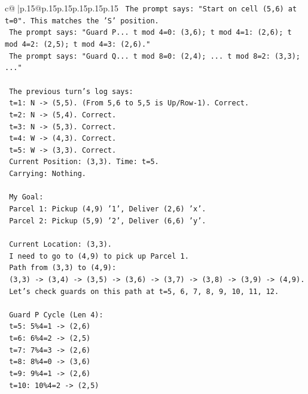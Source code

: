 \documentclass{article}
\begin{document}
{\begin{supertabular}{c@{$\;$}|p{.15\linewidth}@{}p{.15\linewidth}p{.15\linewidth}p{.15\linewidth}p{.15\linewidth}p{.15\linewidth}}
{{{\texttt{  The prompt says: "Start on cell (5,6) at t=0". This matches the 'S' position.} \\
\texttt{  The prompt says: "Guard P... t mod 4=0: (3,6); t mod 4=1: (2,6); t mod 4=2: (2,5); t mod 4=3: (2,6)."} \\
\texttt{  The prompt says: "Guard Q... t mod 8=0: (2,4); ... t mod 8=2: (3,3); ..."} \\
\\ 
\texttt{  The previous turn's log says:} \\
\texttt{  t=1: N {-}> (5,5). (From 5,6 to 5,5 is Up/Row{-}1). Correct.} \\
\texttt{  t=2: N {-}> (5,4). Correct.} \\
\texttt{  t=3: N {-}> (5,3). Correct.} \\
\texttt{  t=4: W {-}> (4,3). Correct.} \\
\texttt{  t=5: W {-}> (3,3). Correct.} \\
\texttt{  Current Position: (3,3). Time: t=5.} \\
\texttt{  Carrying: Nothing.} \\
\\ 
\texttt{  My Goal:} \\
\texttt{  Parcel 1: Pickup (4,9) '1', Deliver (2,6) 'x'.} \\
\texttt{  Parcel 2: Pickup (5,9) '2', Deliver (6,6) 'y'.} \\
\\ 
\texttt{  Current Location: (3,3).} \\
\texttt{  I need to go to (4,9) to pick up Parcel 1.} \\
\texttt{  Path from (3,3) to (4,9):} \\
\texttt{  (3,3) {-}> (3,4) {-}> (3,5) {-}> (3,6) {-}> (3,7) {-}> (3,8) {-}> (3,9) {-}> (4,9).} \\
\texttt{  Let's check guards on this path at t=5, 6, 7, 8, 9, 10, 11, 12.} \\
\\ 
\texttt{  Guard P Cycle (Len 4):} \\
\texttt{  t=5: 5\%4=1 {-}> (2,6)} \\
\texttt{  t=6: 6\%4=2 {-}> (2,5)} \\
\texttt{  t=7: 7\%4=3 {-}> (2,6)} \\
\texttt{  t=8: 8\%4=0 {-}> (3,6)} \\
\texttt{  t=9: 9\%4=1 {-}> (2,6)} \\
\texttt{  t=10: 10\%4=2 {-}> (2,5)} \\
}}}
\end{supertabular}}
\end{document}
